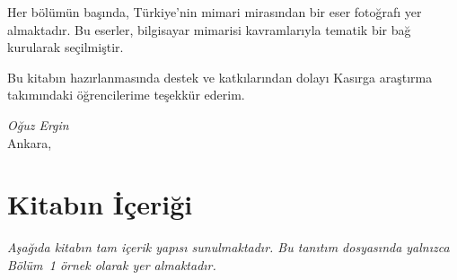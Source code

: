 \documentclass[12pt, a4paper, twoside, openright]{book}
\begin{document}
Her bölümün başında, Türkiye'nin mimari mirasından bir eser fotoğrafı yer almaktadır. Bu eserler, bilgisayar mimarisi kavramlarıyla tematik bir bağ kurularak seçilmiştir.

Bu kitabın hazırlanmasında destek ve katkılarından dolayı Kasırga araştırma takımındaki öğrencilerime teşekkür ederim.

\vspace{1cm}
\begin{flushright}
\textit{Oğuz Ergin}\\
Ankara, \the\year
\end{flushright}
\cleardoublepage

\chapter*{Kitabın İçeriği}

\vspace{0.3cm}
\noindent
{\small\itshape Aşağıda kitabın tam içerik yapısı sunulmaktadır. Bu tanıtım dosyasında yalnızca Bölüm~1 örnek olarak yer almaktadır.}

\vspace{0.8cm}
\end{document}
